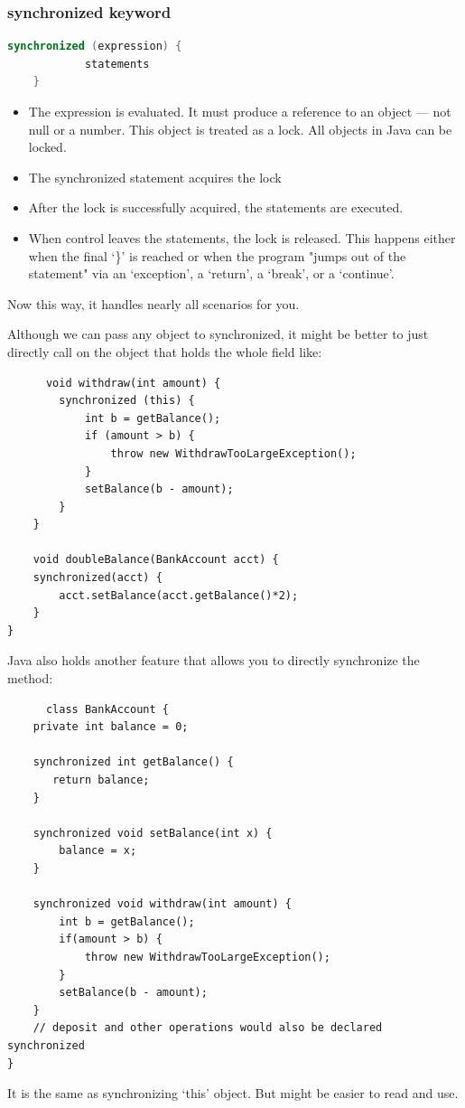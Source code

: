\documentclass[letterpaper,12pt]{article}
\begin{document}
\subsubsection{synchronized keyword}
\begin{lstlisting}[language=Java]
      synchronized (expression) {
            statements
    } 
\end{lstlisting}
\begin{itemize}
      \item The expression is evaluated. It must produce a reference to an object — not null or a number. This object is treated as a lock. All objects in Java can be locked.
      \item The synchronized statement acquires the lock
      \item After the lock is successfully acquired, the statements are executed.
      \item When control leaves the statements, the lock is released. This happens either when the final `\}' is reached or when the program "jumps out of the statement" via an `exception', a `return', a `break', or a `continue'.
\end{itemize}
Now this way, it handles nearly all scenarios for you. 

Although we can pass any object to synchronized, it might be better to just directly call on the object that holds the whole field like:\begin{lstlisting}
      void withdraw(int amount) {
        synchronized (this) {
            int b = getBalance();
            if (amount > b) {
                throw new WithdrawTooLargeException();
            }
            setBalance(b - amount);
        }
    }

    void doubleBalance(BankAccount acct) {
    synchronized(acct) {
        acct.setBalance(acct.getBalance()*2);
    }
}
\end{lstlisting}

Java also holds another feature that allows you to directly synchronize the method:\begin{lstlisting}
      class BankAccount {
    private int balance = 0;
 
    synchronized int getBalance() {
       return balance;
    }
    
    synchronized void setBalance(int x) {
        balance = x;
    }
    
    synchronized void withdraw(int amount) {
        int b = getBalance();
        if(amount > b) {
            throw new WithdrawTooLargeException();
        }
        setBalance(b - amount);
    }
    // deposit and other operations would also be declared synchronized
}
\end{lstlisting}
It is the same as synchronizing `this' object. But might be easier to read and use.
\end{document}
